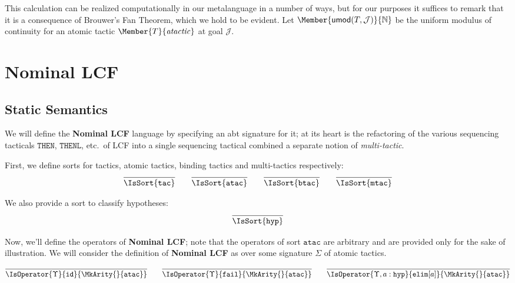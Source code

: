 This calculation can be realized computationally in our metalanguage in a
number of ways, but for our purposes it suffices to remark that it is a
consequence of Brouwer's Fan Theorem, which we hold to be evident. Let
$\Member{\UMod{T}{\mathcal{J}}}{\MLNat}$ be the uniform modulus of continuity
for an atomic tactic $\Member{T}{\LCFAtomicTactic}$ at goal $\mathcal{J}$.

\section{Nominal LCF}

\subsection{Static Semantics}

\newcommand\SortATac{\mathtt{atac}}
\newcommand\SortBTac{\mathtt{btac}}
\newcommand\SortTac{\mathtt{tac}}
\newcommand\SortMTac{\mathtt{mtac}}
\newcommand\SortHyp{\mathtt{hyp}}

We will define the \textbf{Nominal LCF} language by specifying an abt signature
for it; at its heart is the refactoring of the various sequencing tacticals
$\mathtt{THEN}$, $\mathtt{THENL}$, etc.\ of LCF into a single sequencing
tactical combined a separate notion of \emph{multi-tactic}.

First, we define sorts for tactics, atomic tactics, binding tactics and multi-tactics
respectively:
\begin{gather*}
  \infer{
    \IsSort{\SortTac}
  }{}
  \qquad
  \infer{
    \IsSort{\SortATac}
  }{}
  \qquad
  \infer{
    \IsSort{\SortBTac}
  }{}
  \qquad
  \infer{
    \IsSort{\SortMTac}
  }{}
\end{gather*}

We also provide a sort to classify hypotheses:
\[
  \infer{
    \IsSort{\SortHyp}
  }{
  }
\]

Now, we'll define the operators of \textbf{Nominal LCF}; note that the
operators of sort $\SortATac$ are arbitrary and are provided only for the sake
of illustration. We will consider the definition of \textbf{Nominal LCF} as
over some signature $\Sigma$ of atomic tactics.

\[
  \infer{
    \IsOperator{\Upsilon}{\mathtt{id}}{
      \MkArity{}{\SortATac}
    }
  }{
  }
  \qquad
  \infer{
    \IsOperator{\Upsilon}{\mathtt{fail}}{
      \MkArity{}{\SortATac}
    }
  }{
  }
  \qquad
  \infer{
    \IsOperator{\Upsilon,a:\SortHyp}{\mathtt{elim}[a]}{
      \MkArity{}{\SortATac}
    }
  }{
  }
\]

